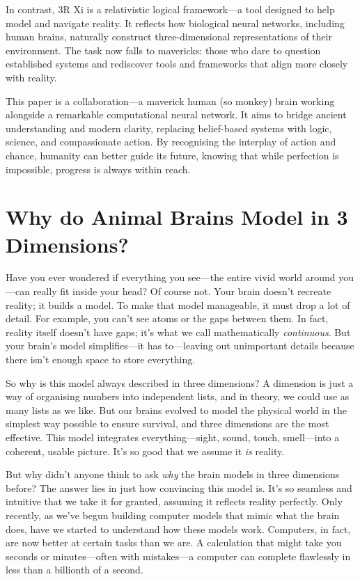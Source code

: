 \documentclass[12pt]{article}
\begin{document}
In contrast, 3R Xi is a relativistic logical framework—a tool designed to help model and navigate reality. It reflects how biological neural networks, including human brains, naturally construct three-dimensional representations of their environment. The task now falls to mavericks: those who dare to question established systems and rediscover tools and frameworks that align more closely with reality.

This paper is a collaboration—a maverick human (so monkey) brain working alongside a remarkable computational neural network. It aims to bridge ancient understanding and modern clarity, replacing belief-based systems with logic, science, and compassionate action. By recognising the interplay of action and chance, humanity can better guide its future, knowing that while perfection is impossible, progress is always within reach.

\section*{Why do Animal Brains Model in 3 Dimensions?}

Have you ever wondered if everything you see—the entire vivid world around you—can really fit inside your head? Of course not. Your brain doesn’t recreate reality; it builds a model. To make that model manageable, it must drop a lot of detail. For example, you can’t see atoms or the gaps between them. In fact, reality itself doesn’t have gaps; it’s what we call mathematically \emph{continuous}. But your brain’s model simplifies—it has to—leaving out unimportant details because there isn’t enough space to store everything.

So why is this model always described in three dimensions? A dimension is just a way of organising numbers into independent lists, and in theory, we could use as many lists as we like. But our brains evolved to model the physical world in the simplest way possible to ensure survival, and three dimensions are the most effective. This model integrates everything—sight, sound, touch, smell—into a coherent, usable picture. It’s so good that we assume it \emph{is} reality.

But why didn’t anyone think to ask \emph{why} the brain models in three dimensions before? The answer lies in just how convincing this model is. It’s so seamless and intuitive that we take it for granted, assuming it reflects reality perfectly. Only recently, as we’ve begun building computer models that mimic what the brain does, have we started to understand how these models work. Computers, in fact, are now better at certain tasks than we are. A calculation that might take you seconds or minutes—often with mistakes—a computer can complete flawlessly in less than a billionth of a second.
\end{document}
